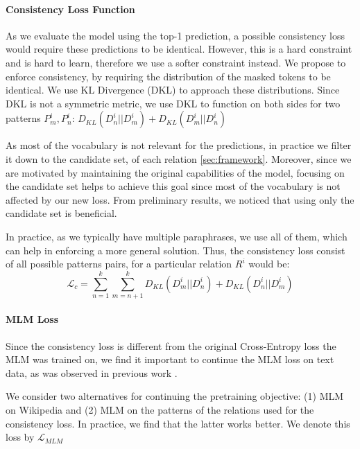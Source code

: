 \paragraph{Consistency Loss Function}
As we evaluate the model using the top-1 prediction, a possible consistency loss would require these predictions to be identical. However, this is a hard constraint and is hard to learn, therefore we use a softer constraint instead.
We propose to enforce consistency, by requiring the distribution of the masked tokens to be identical. We use KL Divergence (DKL) to approach these distributions. Since DKL is not a symmetric metric, we use DKL to function on both sides for two patterns $P^i_m,P^i_n$:
$D_{KL}(D^i_n||D^i_m) + D_{KL} (D^i_m||D^i_n)$

As most of the vocabulary is not relevant for the
predictions, in practice we filter it down to the candidate set, of each relation \ref{sec:framework}.  Moreover, since we are motivated by maintaining the original capabilities of the model, focusing on the candidate set helps to achieve this goal since most of the vocabulary is not affected by our new loss.
From preliminary results, we noticed that using only the candidate set is beneficial.

In practice, as we typically have multiple paraphrases, we use all of them, which can help in enforcing a more general solution. Thus, the consistency loss consist of all possible patterns pairs, for a particular relation $R^i$ would be:
\[
\mathcal{L}_{c} = \sum_{n=1}^k \sum_{m=n+1}^k D_{KL}(D^i_m||D^i_n) + D_{KL}(D^i_n||D^i_m)
\]


\paragraph{MLM Loss}
Since the consistency loss is different from the original Cross-Entropy loss the MLM was trained on, we find it important to continue the MLM loss on text data, as was observed in previous work \cite{geva2020injecting}.

We consider two alternatives for continuing the pretraining objective: (1) MLM on Wikipedia and (2) MLM on the patterns of the relations used for the consistency loss. In practice, we find that the latter works better. We denote this loss by $\mathcal{L}_{MLM}$


